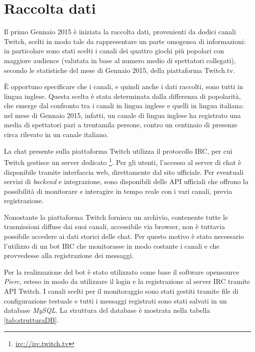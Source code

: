 \documentclass[a4paper,12pt,openright,twoside]{report}
\theoremstyle{definition}
\begin{document}
\section{Raccolta dati}
Il primo Gennaio 2015 è iniziata la raccolta dati, provenienti da dodici canali 
Twitch, scelti in modo tale da rappresentare un parte omogenea di informazioni: in particolare sono stati scelti 
i canali dei quattro giochi più popolari con maggiore audience 
(valutata in base al numero medio di spettatori collegati), 
secondo le statistiche del mese di Gennaio 2015, della piattaforma Twitch.tv.

È opportuno specificare che i canali, e quindi anche i dati raccolti, 
sono tutti in lingua inglese. Questa scelta è stata determinata dalla 
differenza di popolarità, che emerge dal confronto tra i canali in lingua 
inglese e quelli in lingua italiana:
nel mese di Gennaio 2015, infatti, un canale di lingua inglese ha registrato una 
media di spettatori pari a trentamila persone, 
contro un centinaio di presenze circa rilevato in un canale italiano.

La chat presente sulla piattaforma Twitch utilizza il protocollo IRC, 
per cui Twitch gestisce un server dedicato \footnote{\url{irc://irc.twitch.tv}}. 
Per gli utenti, l’accesso al server di chat è disponibile tramite interfaccia web, 
direttamente dal sito ufficiale. Per eventuali servizi di \emph{backend}
e integrazione, sono disponibili 
delle API ufficiali che offrono la possibilità di monitorare e interagire in tempo reale 
con i vari canali, previa registrazione.

Nonostante la piattaforma Twitch fornisca un archivio, contenente tutte le trasmissioni diffuse dai suoi canali, 
accessibile via browser, non è tuttavia possibile accedere ai dati storici delle chat.
Per questo motivo è stato necessario l’utilizzo di un bot IRC che monitorasse in 
modo costante i canali e che provvedesse alla registrazione dei messaggi.

Per la realizzazione del bot è stato utilizzato come base il software opensource \emph{Pierc},
esteso in modo da utilizzare il login e la registrazione 
al server IRC tramite API Twitch. I canali scelti per il monitoraggio sono stati 
gestiti tramite file di configurazione testuale e tutti i messaggi registrati sono stati salvati 
in un database \emph{MySQL}. La struttura del database è mostrata nella tabella \ref{tab:strutturaDB}.
\end{document}
